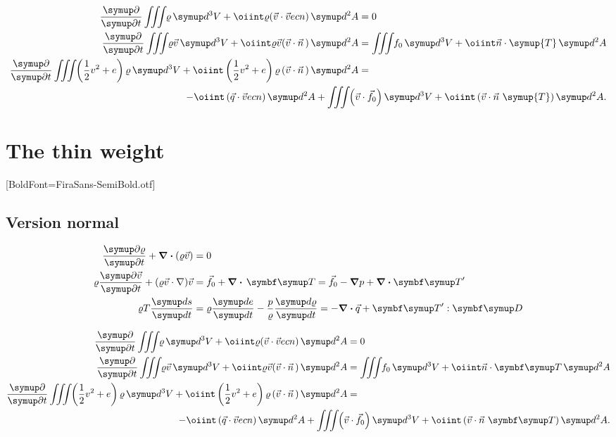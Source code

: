 \documentclass[english,log-declarations=false]{article}
\begin{document}
\setBold
\begin{align}
 \Q{}{t}\iiint\<\varrho\diff^3V+\oiint\varrho(\vec{v}\cdot\vec{v}ec{n})\diff^2A          &= 0\\
 \Q{}{t}\iiint\<\varrho\vec{v}\diff^3V+\oiint\varrho\vec{v}(\vec{v}\cdot\vec{n}\,)\diff^2A &=
        \iiint\<f_0\diff^3V+\oiint\vec{n}\cdot\symup{T}\diff^2A \\
 \Q{}{t}\iiint\<\left(\half v^2+e\right)\varrho\diff^3V+\oiint\left(\half v^2+e\right)
        \varrho\left(\vec{v}\cdot\vec{n}\,\right)\diff^2A                                & =\\
 \multispan2{\hfill${\displaystyle-\oiint\left(\vec{q}\cdot\vec{v}ec{n}\right)\diff^2A+
         \iiint\<\left(\vec{v}\cdot\vec{f}_0\right)\diff^3V+\oiint\left(\vec{v}
         \cdot\vec{n}~\symup{T}\right)\diff^2A}$}.\nonumber
\end{align}

\unsetBold

\iffalse
\section{The thin  weight}

\setsansfont{FiraSans-Thin.otf}[BoldFont=FiraSans-SemiBold.otf]

\subsection{Version normal}

\begin{align}
\begin{aligned}
  \Q{\varrho}{t}+\div(\varrho\vec{v}) &= 0 \\
  \varrho\Q{\vec{v}}{t}+(\varrho\vec{v}\cdot\nabla)\vec{v}   &= \vec{f}_0+\div\,\TT=\vec{f}_0
	-\grad p+\div\TT' \\
  \varrho T\frac{\diff s}{\diff t}               &= \varrho\frac{\diff e}{\diff t}
    -\frac{p}{\varrho}\frac{\diff\varrho}{\diff t}=-\div\vec{q}+\TT':\DD 
\end{aligned}
\end{align}

\begin{align}
 \Q{}{t}\iiint\<\varrho\diff^3V+\oiint\varrho(\vec{v}\cdot\vec{v}ec{n})\diff^2A          &= 0\\
 \Q{}{t}\iiint\<\varrho\vec{v}\diff^3V+\oiint\varrho\vec{v}(\vec{v}\cdot\vec{n}\,)\diff^2A &=
        \iiint\<f_0\diff^3V+\oiint\vec{n}\cdot\TT\diff^2A \\
 \Q{}{t}\iiint\<\left(\half v^2+e\right)\varrho\diff^3V+\oiint\left(\half v^2+e\right)
        \varrho\left(\vec{v}\cdot\vec{n}\,\right)\diff^2A                                & =\\
 \multispan2{\hfill${\displaystyle-\oiint\left(\vec{q}\cdot\vec{v}ec{n}\right)\diff^2A+
         \iiint\<\left(\vec{v}\cdot\vec{f}_0\right)\diff^3V+\oiint\left(\vec{v}
         \cdot\vec{n}~\TT\right)\diff^2A}$}.\nonumber
\end{align}
\end{document}
